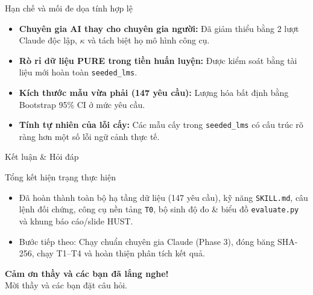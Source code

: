 \documentclass[aspectratio=169,10pt]{beamer}
\begin{document}
\begin{frame}{Hạn chế và mối đe dọa tính hợp lệ}
  \begin{itemize}
    \item \textbf{Chuyên gia AI thay cho chuyên gia người:} Đã giảm thiểu bằng 2 lượt Claude độc lập, $\kappa$ và tách biệt họ mô hình công cụ.
    \item \textbf{Rò rỉ dữ liệu PURE trong tiền huấn luyện:} Được kiểm soát bằng tài liệu mới hoàn toàn \texttt{seeded\_lms}.
    \item \textbf{Kích thước mẫu vừa phải (147 yêu cầu):} Lượng hóa bất định bằng Bootstrap 95\% CI ở mức yêu cầu.
    \item \textbf{Tính tự nhiên của lỗi cấy:} Các mẫu cấy trong \texttt{seeded\_lms} có cấu trúc rõ ràng hơn một số lỗi ngữ cảnh thực tế.
  \end{itemize}
\end{frame}

\begin{frame}{Kết luận \& Hỏi đáp}
  \begin{block}{Tổng kết hiện trạng thực hiện}
    \begin{itemize}
      \item Đã hoàn thành toàn bộ hạ tầng dữ liệu (147 yêu cầu), kỹ năng \texttt{SKILL.md}, câu lệnh đối chứng, công cụ nền tảng \texttt{T0}, bộ sinh độ đo \& biểu đồ \texttt{evaluate.py} và khung báo cáo/slide HUST.
      \item Bước tiếp theo: Chạy chuẩn chuyên gia Claude (Phase 3), đóng băng SHA-256, chạy T1--T4 và hoàn thiện phân tích kết quả.
    \end{itemize}
  \end{block}
  \centering
  \vspace{0.3cm}
  {\Large\bfseries\color{hustred} Cảm ơn thầy và các bạn đã lắng nghe!}\\[0.15cm]
  {\small Mời thầy và các bạn đặt câu hỏi.}
\end{frame}
\end{document}
